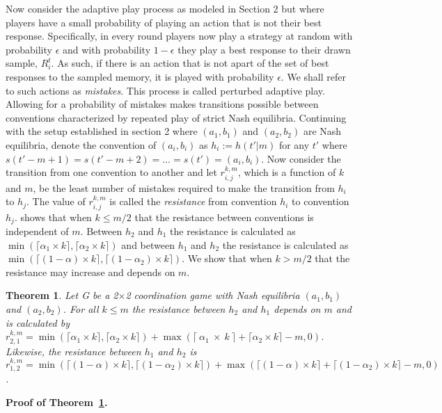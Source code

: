 \documentclass[11.5pt]{article}
\newtheorem{theorem}{Theorem}
\begin{document}
Now consider the adaptive play process as modeled in Section 2 but where players have a small probability of playing an action that is not their best response. Specifically, in every round players now play a strategy at random with probability $\epsilon$ and with probability $1-\epsilon$ they play a best response to their drawn sample, $R_i^{t}$. As such, if there is an action that is not apart of the set of best responses to the sampled memory, it is played with probability $\epsilon$. We shall refer to such actions as \textit{mistakes}. This process is called perturbed adaptive play. Allowing for a probability of mistakes makes transitions possible between conventions characterized by repeated play of strict Nash equilibria. Continuing with the setup established in section 2 where $(a_1, b_1)$ and $(a_2, b_2)$ are Nash equilibria, denote the convention of $(a_i, b_i)$ as $h_i := h(t'|m)$ for any $t'$ where $s(t'-m+1) = s(t'-m+2) = \dots = s(t') = (a_i, b_i)$. Now consider the transition from one convention to another and let $r_{i,j}^{k,m}$, which is a function of $k$ and $m$, be the least number of mistakes required to make the transition from $h_i$ to $h_j$. The value of $r_{i,j}^{k,m}$ is called the \textit{resistance} from convention $h_i$ to convention $h_j$. \cite{Young1998} shows that when $k \leq m/2$ that the resistance between conventions is independent of $m$. Between $h_2$ and $h_1$ the resistance is calculated as $\min(\lceil \alpha_1 \times k \rceil,\lceil \alpha_2 \times k \rceil)$ and between $h_1$ and $h_2$ the resistance is calculated as 
$\min(\lceil (1-\alpha) \times k \rceil,\lceil (1-\alpha_2) \times  k \rceil)$. We show that when $k > m/2$ that the resistance may increase and depends on $m$.


\begin{theorem}\label{Theorem_3}
Let G be a 2$\times$2 coordination game with Nash equilibria $(a_1,b_1)$ and $(a_2,b_2)$. For all $k \leq m$ the resistance between $h_2$ and $h_1$ depends on $m$ and is calculated by $r_{2,1}^{k,m} = \min(\lceil \alpha_1 \times k \rceil,\lceil \alpha_2 \times k \rceil)+\max(\lceil~\alpha_1~\times~k~\rceil+\lceil \alpha_2 \times k \rceil-m,0)$. Likewise, the resistance between $h_1$ and $h_2$ is $r^{k,m}_{1,2}=\min(\lceil (1-\alpha) \times k \rceil, \lceil (1-\alpha_2) \times  k \rceil)+\max(\lceil (1-\alpha) \times k \rceil+\lceil (1-\alpha_2) \times k \rceil-m,0)$.
\end{theorem}


\textbf{Proof of Theorem~\ref{Theorem_3}.}
\end{document}
